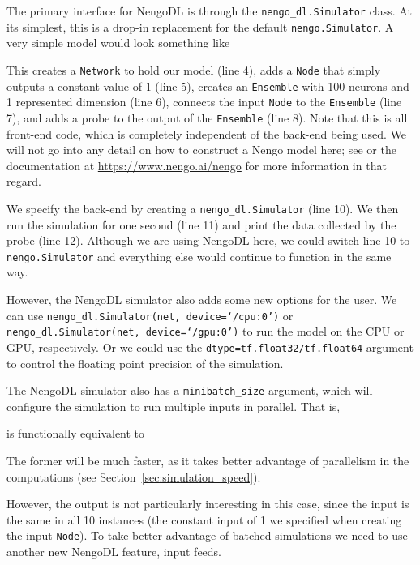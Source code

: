 \documentclass{article}
\begin{document}
The primary interface for NengoDL is through the \texttt{nengo\_dl.Simulator} class.  At its simplest, this is a drop-in replacement for the default \texttt{nengo.Simulator}.  A very simple model would look something like

\lstset{language=Python, numbers=left, columns=fixed, basicstyle=\ttfamily}


This creates a \texttt{Network} to hold our model (line 4), adds a \texttt{Node} that simply outputs a constant value of 1 (line 5), creates an \texttt{Ensemble} with 100 neurons and 1 represented dimension (line 6), connects the input \texttt{Node} to the \texttt{Ensemble} (line 7), and adds a probe to the output of the \texttt{Ensemble} (line 8).  Note that this is all front-end code, which is completely independent of the back-end being used.  We will not go into any detail on how to construct a Nengo model here; see \citet{Bekolay2014} or the documentation at \url{https://www.nengo.ai/nengo} for more information in that regard.

We specify the back-end by creating a \texttt{nengo\_dl.Simulator} (line 10).  We then run the simulation for one second (line 11) and print the data collected by the probe (line 12).  Although we are using NengoDL here, we could switch line 10 to \texttt{nengo.Simulator} and everything else would continue to function in the same way.

However, the NengoDL simulator also adds some new options for the user.  We can use \texttt{nengo\_dl.Simulator(net, device=`/cpu:0')} or \texttt{nengo\_dl.Simulator(net, device=`/gpu:0')} to run the model on the CPU or GPU, respectively.  Or we could use the \texttt{dtype=tf.float32/tf.float64} argument to control the floating point precision of the simulation.

The NengoDL simulator also has a \texttt{minibatch\_size} argument, which will configure the simulation to run multiple inputs in parallel.  That is,

\lstset{numbers=none}


is functionally equivalent to



The former will be much faster, as it takes better advantage of parallelism in the computations (see Section~\ref{sec:simulation_speed}).  

However, the output is not particularly interesting in this case, since the input is the same in all 10 instances (the constant input of 1 we specified when creating the input \texttt{Node}).  To take better advantage of batched simulations we need to use another new NengoDL feature, input feeds.
\end{document}
